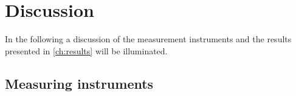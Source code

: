 \chapter{Discussion}\label{ch:discussion}
In the following a discussion of the measurement instruments and the results presented in \cref*{ch:results} will be illuminated.%


\section{Measuring instruments}
